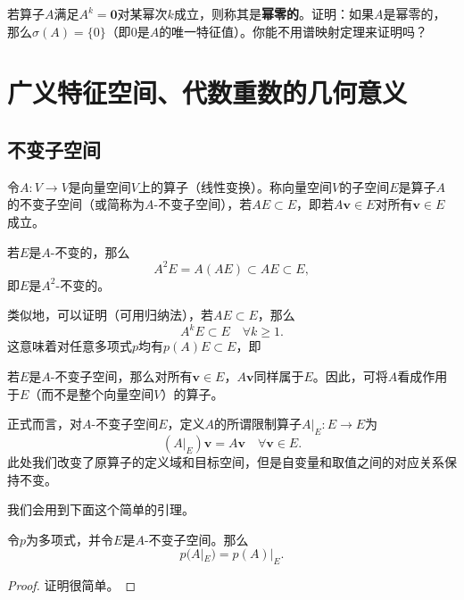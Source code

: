\begin{problemset}
    \item \label{ex:9_2_1}若算子$A$满足$A^k=\mathbf{0}$对某幂次$k$成立，则称其是{\bf 幂零的}。证明：如果$A$是幂零的，那么$\sigma(A)=\{0\}$（即$0$是$A$的唯一特征值）。你能不用谱映射定理来证明吗？
\end{problemset}

\section{广义特征空间、代数重数的几何意义}

\subsection{不变子空间}\label{subsec:invariant_subspace}

\begin{definition*}
    令$A:V\to V$是向量空间$V$上的算子（线性变换）。称向量空间$V$的子空间$E$是算子$A$的不变子空间（或简称为$A$-不变子空间），若$AE\subset E$，即若$A\mathbf{v}\in E$对所有$\mathbf{v}\in E$成立。
\end{definition*}

若$E$是$A$-不变的，那么\[A^2E = A(AE) \subset AE \subset E,\]
即$E$是$A^2$-不变的。

类似地，可以证明（可用归纳法），若$AE \subset E$，那么\[A^kE\subset E\quad \forall k\ge 1.\]
这意味着对任意多项式$p$均有$p(A)E\subset E$，即
\begin{center}
\end{center}

若$E$是$A$-不变子空间，那么对所有$\mathbf{v}\in E$，$A\mathbf{v}$同样属于$E$。因此，可将$A$看成作用于$E$（而不是整个向量空间$V$）的算子。

正式而言，对$A$-不变子空间$E$，定义$A$的所谓限制算子$A|_E:E\to E$为
\[(A|_E)\mathbf{v}=A\mathbf{v}\quad \forall \mathbf{v}\in E.\]
此处我们改变了原算子的定义域和目标空间，但是自变量和取值之间的对应关系保持不变。

我们会用到下面这个简单的引理。

\begin{lemma}\label{lem:A_restrict_p}
    令$p$为多项式，并令$E$是$A$-不变子空间。那么\[p(A|_E)=p(A)|_E.\]
\end{lemma}
\begin{proof}
    证明很简单。
\end{proof}


